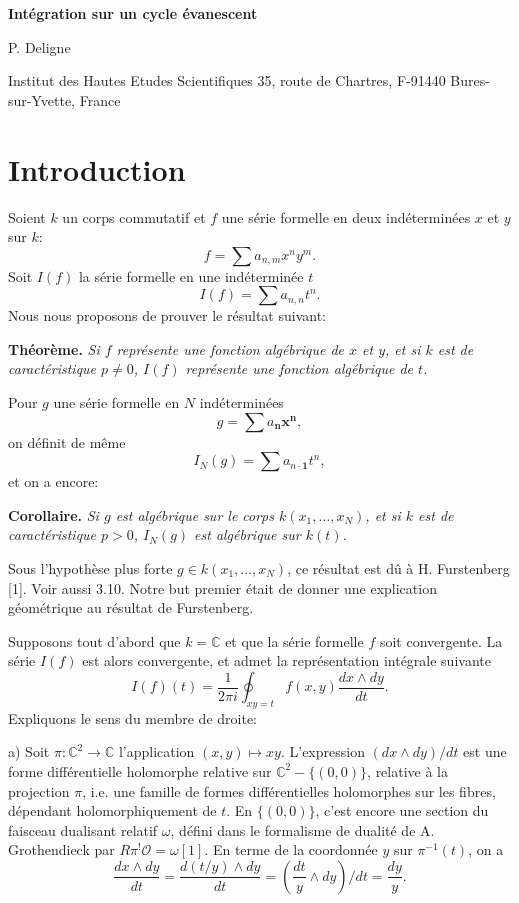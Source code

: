 \documentclass[11pt,leqno]{article}
\newcommand{\OO}{\mathcal O}
\newcommand{\CC}{\mathbb C}
\begin{document}
\setcounter{page}{129}
\begin{center}
{\LARGE\bfseries Intégration sur un cycle évanescent}\par
\vspace{1.0em}
{\large P. Deligne}\par
\vspace{0.4em}
Institut des Hautes Etudes Scientifiques 35, route de Chartres, F-91440 Bures-sur-Yvette, France
\end{center}
\section*{Introduction}

Soient $k$ un corps commutatif et $f$ une série formelle en deux indéterminées $x$ et $y$ sur $k$:
\[
        f=\sum a_{n,m}x^n y^m .
\]
Soit $I(f)$ la série formelle en une indéterminée $t$
\[
        I(f)=\sum a_{n,n}t^n .
\]
Nous nous proposons de prouver le résultat suivant:

\medskip
\noindent\textbf{Théorème.} \emph{Si $f$ représente une fonction algébrique de $x$ et $y$, et si $k$ est de caractéristique $p\ne0$, $I(f)$ représente une fonction algébrique de $t$.}

\medskip
Pour $g$ une série formelle en $N$ indéterminées
\[
        g=\sum a_{\boldsymbol n}\boldsymbol x^{\boldsymbol n},
\]
on définit de même
\[
        I_N(g)=\sum a_{n\cdot\mathbf 1}t^n,
\]
et on a encore:

\medskip
\noindent\textbf{Corollaire.} \emph{Si $g$ est algébrique sur le corps $k(x_1,\ldots,x_N)$, et si $k$ est de caractéristique $p>0$, $I_N(g)$ est algébrique sur $k(t)$.}

\medskip
Sous l'hypothèse plus forte $g\in k(x_1,\ldots,x_N)$, ce résultat est dû à H. Furstenberg [1]. Voir aussi 3.10. Notre but premier était de donner une explication géométrique au résultat de Furstenberg.

Supposons tout d'abord que $k=\CC$ et que la série formelle $f$ soit convergente. La série $I(f)$ est alors convergente, et admet la représentation intégrale suivante
\begin{equation}
        I(f)(t)=\frac{1}{2\pi i}\oint_{xy=t} f(x,y)\frac{dx\wedge dy}{dt}. \tag{1}
\end{equation}
\clearpage
Expliquons le sens du membre de droite:

\medskip
\noindent a) Soit $\pi:\CC^2\to\CC$ l'application $(x,y)\mapsto xy$. L'expression $(dx\wedge dy)/dt$ est une forme différentielle holomorphe relative sur $\CC^2-\{(0,0)\}$, relative à la projection $\pi$, i.e. une famille de formes différentielles holomorphes sur les fibres, dépendant holomorphiquement de $t$. En $\{(0,0)\}$, c'est encore une section du faisceau dualisant relatif $\omega$, défini dans le formalisme de dualité de A. Grothendieck par $R\pi^!\OO=\omega[1]$. En terme de la coordonnée $y$ sur $\pi^{-1}(t)$, on a
\[
        \frac{dx\wedge dy}{dt}=\frac{d(t/y)\wedge dy}{dt}
        =\left(\frac{dt}{y}\wedge dy\right)/dt=\frac{dy}{y}.
\]
\end{document}
